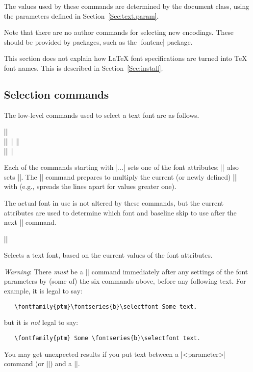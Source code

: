 \documentclass{ltxguide}[1995/11/28]
\begin{document}
The values used by these commands are determined by the document class,
using the parameters defined in Section~\ref{Sec:text.param}.

Note that there are no author commands for selecting new encodings.
These should be provided by packages, such as the |fontenc| package.

This section does not explain how \LaTeX{} font specifications are
turned into \TeX{} font names.  This is described in
Section~\ref{Sec:install}.



\subsection{Selection commands}

The low-level commands used to select a text font are as follows.

\begin{decl}
  |\fontencoding|  \\
  |\fontfamily|   \qquad
  |\fontseries|  \qquad
  |\fontshape|  \\
  |\fontsize|   \qquad
  |\linespread| 
\end{decl}

Each of the commands starting with |\font...| sets one of the font
attributes; |\fontsize| also sets |\baselineskip|. The |\linespread|
command prepares to multiply the current (or newly defined)
|\baselineskip| with  (e.g., spreads the lines apart for
values greater one).

The actual font in use is not altered by these commands, but the
current attributes are used to determine which font and baseline skip
to use after the next |\selectfont| command.

\begin{decl}
  |\selectfont|
\end{decl}
Selects a text font, based on the current values of the font attributes.

\emph{Warning}: There \emph{must} be a |\selectfont| command immediately
after any settings of the font parameters by (some of) the six commands
above, before any following text.  For example, it is legal to say:
\begin{verbatim}
   \fontfamily{ptm}\fontseries{b}\selectfont Some text.
\end{verbatim}
but it is \emph{not} legal to say:
\begin{verbatim}
   \fontfamily{ptm} Some \fontseries{b}\selectfont text.
\end{verbatim}
You may get unexpected results if you put text between a
|\font<parameter>| command (or |\linespread|) and a |\selectfont|.
\end{document}
